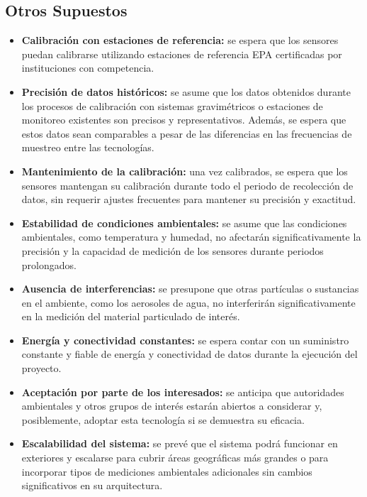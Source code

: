 \subsection{Otros Supuestos}

\begin{itemize}
	
	\item \textbf{Calibración con estaciones de referencia:} se espera que los sensores puedan calibrarse utilizando estaciones de referencia EPA certificadas por instituciones con competencia.
	
	\item \textbf{Precisión de datos históricos:} se asume que los datos obtenidos durante los procesos de calibración con sistemas gravimétricos o estaciones de monitoreo existentes son precisos y representativos. Además, se espera que estos datos sean comparables a pesar de las diferencias en las frecuencias de muestreo entre las tecnologías.
	
	\item \textbf{Mantenimiento de la calibración:} una vez calibrados, se espera que los sensores mantengan su calibración durante todo el periodo de recolección de datos, sin requerir ajustes frecuentes para mantener su precisión y exactitud.
	
	\item \textbf{Estabilidad de condiciones ambientales:} se asume que las condiciones ambientales, como temperatura y humedad, no afectarán significativamente la precisión y la capacidad de medición de los sensores durante periodos prolongados.
	
	\item \textbf{Ausencia de interferencias:} se presupone que otras partículas o sustancias en el ambiente, como los aerosoles de agua, no interferirán significativamente en la medición del material particulado de interés.
	
	\item \textbf{Energía y conectividad constantes:} se espera contar con un suministro constante y fiable de energía y conectividad de datos durante la ejecución del proyecto.
	
	\item \textbf{Aceptación por parte de los interesados:} se anticipa que autoridades ambientales y otros grupos de interés estarán abiertos a considerar y, posiblemente, adoptar esta tecnología si se demuestra su eficacia.
	
	\item \textbf{Escalabilidad del sistema:}  se prevé que el sistema podrá funcionar en exteriores y escalarse para cubrir áreas geográficas más grandes o para incorporar tipos de mediciones ambientales adicionales sin cambios significativos en su arquitectura.
	

\end{itemize}
